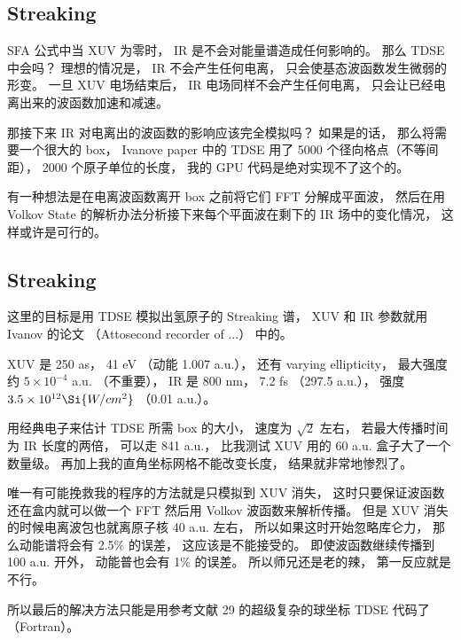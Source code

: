 \subsection{Streaking}
SFA 公式中当 XUV 为零时， IR 是不会对能量谱造成任何影响的。 那么 TDSE 中会吗？ 理想的情况是， IR 不会产生任何电离， 只会使基态波函数发生微弱的形变。 一旦 XUV 电场结束后， IR 电场同样不会产生任何电离， 只会让已经电离出来的波函数加速和减速。

那接下来 IR 对电离出的波函数的影响应该完全模拟吗？ 如果是的话， 那么将需要一个很大的 box， Ivanove paper 中的 TDSE 用了 5000 个径向格点（不等间距）， 2000 个原子单位的长度， 我的 GPU 代码是绝对实现不了这个的。

有一种想法是在电离波函数离开 box 之前将它们 FFT 分解成平面波， 然后在用 Volkov State 的解析办法分析接下来每个平面波在剩下的 IR 场中的变化情况， 这样或许是可行的。


\subsection{Streaking}
这里的目标是用 TDSE 模拟出氢原子的 Streaking 谱， XUV 和 IR 参数就用 Ivanov 的论文 （Attosecond recorder of ...） 中的。

XUV 是 250 as， 41 eV （动能 1.007 a.u.）， 还有 varying ellipticity， 最大强度约 $5\times 10^{-4}$ a.u. （不重要）， IR 是 800 nm， 7.2 fs （297.5 a.u.）， 强度 $3.5\times 10^{12} \Si{W/cm^2}$ （0.01 a.u.）。

用经典电子来估计 TDSE 所需 box 的大小， 速度为 $\sqrt{2}$ 左右， 若最大传播时间为 IR 长度的两倍， 可以走 841 a.u.， 比我测试 XUV 用的 60 a.u. 盒子大了一个数量级。 再加上我的直角坐标网格不能改变长度， 结果就非常地惨烈了。

唯一有可能挽救我的程序的方法就是只模拟到 XUV 消失， 这时只要保证波函数还在盒内就可以做一个 FFT 然后用 Volkov 波函数来解析传播。 但是 XUV 消失的时候电离波包也就离原子核 40 a.u. 左右， 所以如果这时开始忽略库仑力， 那么动能谱将会有 2.5\% 的误差， 这应该是不能接受的。 即使波函数继续传播到 100 a.u. 开外， 动能普也会有 1\% 的误差。 所以师兄还是老的辣， 第一反应就是不行。

所以最后的解决方法只能是用参考文献 29 的超级复杂的球坐标 TDSE 代码了（Fortran）。
